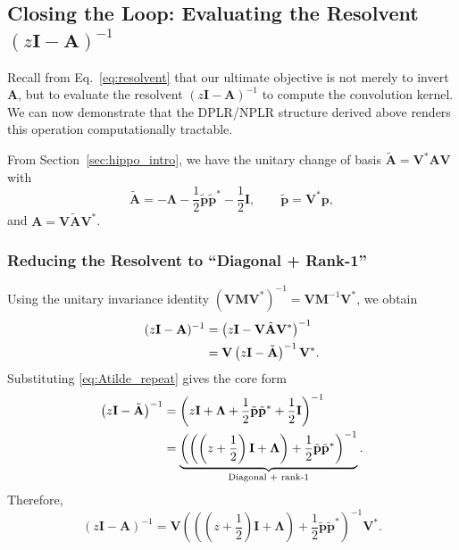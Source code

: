 \documentclass[a4paper,11pt]{article}
\begin{document}
\subsection{Closing the Loop: Evaluating the Resolvent \texorpdfstring{$(z\mathbf{I} - \mathbf{A})^{-1}$}{(zI - A)^{-1}}}
\label{sec:resolvent_evaluation}

Recall from Eq.~\eqref{eq:resolvent} that our ultimate objective is not merely to invert $\mathbf{A}$, but to evaluate the resolvent $(z\mathbf{I} - \mathbf{A})^{-1}$ to compute the convolution kernel. We can now demonstrate that the DPLR/NPLR structure derived above renders this operation computationally tractable.

From Section~\ref{sec:hippo_intro}, we have the unitary change of basis $\tilde{\mathbf{A}}=\mathbf{V}^*\mathbf{A}\mathbf{V}$ with
\begin{equation}\label{eq:Atilde_repeat}
\tilde{\mathbf{A}} = -\mathbf{\Lambda} - \frac{1}{2}\tilde{\mathbf{p}}\tilde{\mathbf{p}}^* - \frac{1}{2}\mathbf{I},
\qquad
\tilde{\mathbf{p}}=\mathbf{V}^*\mathbf{p},
\end{equation}
and $\mathbf{A}=\mathbf{V}\tilde{\mathbf{A}}\mathbf{V}^*$.

\subsubsection{Reducing the Resolvent to ``Diagonal + Rank-1''}
Using the unitary invariance identity $(\mathbf{V}\mathbf{M}\mathbf{V}^*)^{-1}=\mathbf{V}\mathbf{M}^{-1}\mathbf{V}^*$, we obtain
\begin{align}
(z\mathbf{I}-\mathbf{A})^{-1}
&= \left(z\mathbf{I}-\mathbf{V}\tilde{\mathbf{A}}\mathbf{V}^*\right)^{-1} \notag\\
&= \mathbf{V}\left(z\mathbf{I}-\tilde{\mathbf{A}}\right)^{-1}\mathbf{V}^*. \label{eq:resolvent_unitary_pullout}
\end{align}
Substituting \eqref{eq:Atilde_repeat} gives the core form
\begin{align}
\left(z\mathbf{I}-\tilde{\mathbf{A}}\right)^{-1}
&= \left(z\mathbf{I} + \mathbf{\Lambda} + \frac{1}{2}\tilde{\mathbf{p}}\tilde{\mathbf{p}}^* + \frac{1}{2}\mathbf{I}\right)^{-1} \notag\\
&= \underbrace{\left(\left(\left(z+\frac{1}{2}\right)\mathbf{I}+\mathbf{\Lambda}\right) + \frac{1}{2}\tilde{\mathbf{p}}\tilde{\mathbf{p}}^*\right)^{-1}}_{\text{Diagonal + rank-1}}. \label{eq:core_calculation}
\end{align}
Therefore,
\begin{equation}\label{eq:resolvent_final_form}
(z\mathbf{I}-\mathbf{A})^{-1}
= \mathbf{V}\left(\left(\left(z+\frac{1}{2}\right)\mathbf{I}+\mathbf{\Lambda}\right) + \frac{1}{2}\tilde{\mathbf{p}}\tilde{\mathbf{p}}^*\right)^{-1}\mathbf{V}^*.
\end{equation}
\end{document}
